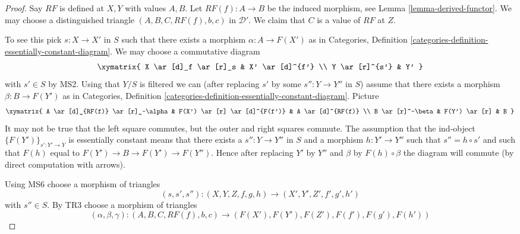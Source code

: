 \begin{proof}
Say $RF$ is defined at $X, Y$ with values $A, B$.
Let $RF(f) : A \to B$ be the induced morphism, see
Lemma \ref{lemma-derived-functor}.
We may choose a distinguished triangle
$(A, B, C, RF(f), b, c)$
in $\mathcal{D}'$. We claim that $C$ is a value of $RF$ at $Z$.

\medskip\noindent
To see this pick $s : X \to X'$ in $S$ such that there exists a morphism
$\alpha : A \to F(X')$ as in
Categories,
Definition \ref{categories-definition-essentially-constant-diagram}.
We may choose a commutative diagram
$$
\xymatrix{
X \ar[d]_f \ar[r]_s & X' \ar[d]^{f'} \\
Y \ar[r]^{s'} & Y'
}
$$
with $s' \in S$ by MS2. Using that $Y/S$ is filtered we can (after replacing
$s'$ by some $s'' : Y \to Y''$ in $S$) assume that there exists
a morphism $\beta : B \to F(Y')$ as in
Categories,
Definition \ref{categories-definition-essentially-constant-diagram}.
Picture
$$
\xymatrix{
A \ar[d]_{RF(f)} \ar[r]_-\alpha &
F(X') \ar[r] \ar[d]^{F(f')} &
A \ar[d]^{RF(f)} \\
B \ar[r]^-\beta & F(Y') \ar[r] & B
}
$$
It may not be true that the left square commutes, but the outer and
right squares commute.
The assumption that the ind-object $\{F(Y')\}_{s' : Y' \to Y}$
is essentially constant means that there exists a $s'' : Y \to Y''$
in $S$ and a morphism $h : Y' \to Y''$ such that $s'' = h \circ s'$ and
such that $F(h)$ equal to $F(Y') \to B \to F(Y') \to F(Y'')$. Hence
after replacing $Y'$ by $Y''$ and $\beta$ by $F(h) \circ \beta$ the
diagram will commute (by direct computation with arrows).

\medskip\noindent
Using MS6 choose a morphism of triangles
$$
(s, s', s'') : (X, Y, Z, f, g, h) \longrightarrow (X', Y', Z', f', g', h')
$$
with $s'' \in S$. By TR3 choose a morphism of triangles
$$
(\alpha, \beta, \gamma) :
(A, B, C, RF(f), b, c)
\longrightarrow
(F(X'), F(Y'), F(Z'), F(f'), F(g'), F(h'))
$$


\end{proof}
